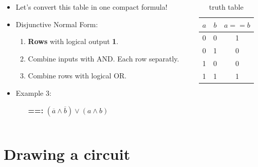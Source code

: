 \documentclass{beamer}
\begin{document}
\begin{frame}
  
  \begin{columns}
  \begin{column}{6cm}
  \begin{itemize}
    \item Let's convert this table in one compact formula!
    \item Disjunctive Normal Form:
    \begin{enumerate}
     \item \textbf{Rows} with logical output \textbf{1}.
     \item Combine inputs with AND. Each row separatly.
     \item Combine rows with logical OR.
    \end{enumerate}

    
    \item Example 3: 
    \begin{itemize}
      \item [\textbf{==:}]$(\overline{a}\land \overline{b})\lor(a\land b)$
    \end{itemize}
  \end{itemize}
  \end{column}
  
    
  \begin{column}{6cm}
  \begin{table}[H]
  \centering
  \begin{tabular}{c|c||c}
  \textbf{$a$} & \textbf{$b$} & \textbf{$a == b$} \\ \hline
  0          & 0          & 1      \\
  0          & 1          & 0  \\
  1          & 0          & 0   \\
  1          & 1          & 1 
  \end{tabular}
  \caption{truth table}
  \label{tab:truth}
  \end{table}
  \end{column}
  
  \end{columns}  
  
  
  
\end{frame}







\section{Drawing a circuit}
\end{document}
